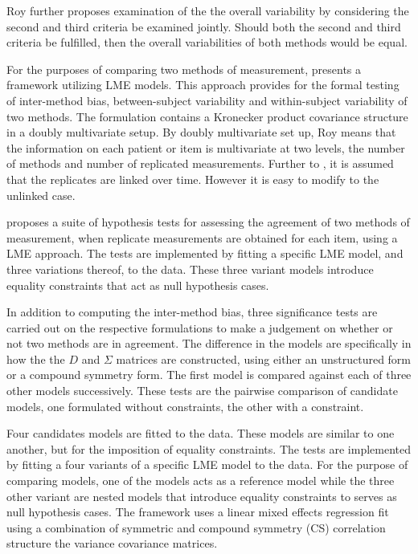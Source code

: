 \documentclass[12pt, a4paper]{report}
\theoremstyle{plain}
\theoremstyle{definition}
\theoremstyle{remark}
\begin{document}
	Roy further proposes examination of the the overall variability by considering the second and third criteria be examined jointly. Should both the second and third criteria be fulfilled, then the overall variabilities of both methods would be equal.
	
	For the purposes of comparing two methods of measurement, \citet{ARoy2009} presents a framework utilizing LME models. This approach provides for the formal testing of inter-method bias, between-subject variability and within-subject variability of two methods. The formulation contains a Kronecker product covariance structure in a doubly multivariate setup. By doubly multivariate set up, Roy means that the information on each patient or item is multivariate at two levels, the number of methods and number of replicated measurements. Further to \citet{lam}, it is assumed that the replicates are linked over time. However it is easy to modify to the unlinked case.
	
	\citet{ARoy2009} proposes a suite of hypothesis tests for assessing the agreement of two methods of measurement, when replicate measurements are obtained for each item, using a LME approach. The tests are implemented by fitting a specific LME model, and three variations thereof, to the data. These three variant models introduce equality constraints that act as null hypothesis cases.
	
	In addition to computing the inter-method bias, three significance tests are carried out on the respective formulations to make a judgement on whether or not two methods are in agreement. The difference in the models are specifically in how the the $D$ and $\Sigma$ matrices are constructed, using either an unstructured form or a compound symmetry form. The first model is compared against each of three other models successively. These tests are the pairwise comparison of candidate models, one formulated without constraints, the other with a constraint.
	
	
Four candidates models are fitted to the data. These models are similar to one another, but for the imposition of equality constraints. The tests are implemented by fitting a four variants of a specific LME model to the data. For the purpose of comparing models, one of the models acts as a reference model while the three other variant are nested models that introduce equality constraints to serves as null hypothesis cases. The framework uses a linear mixed effects regression fit using a combination of symmetric and compound symmetry (CS) correlation structure the variance covariance matrices.	
	
\end{document}
